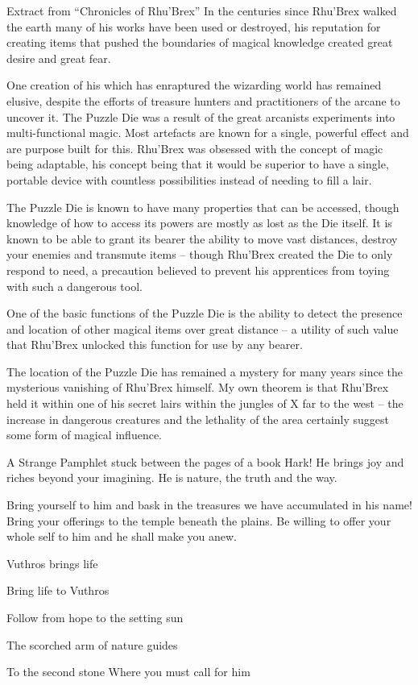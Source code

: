 \begin{DndComment}{Extract from ``Chronicles of Rhu'Brex''}
In the centuries since Rhu'Brex walked the earth many of his works have been used or destroyed, his reputation for creating items that pushed the boundaries of magical knowledge created great desire and great fear.

One creation of his which has enraptured the wizarding world has remained elusive, despite the efforts of treasure hunters and practitioners of the arcane to uncover it. The Puzzle Die was a result of the great arcanists experiments into multi-functional magic. Most artefacts are known for a single, powerful effect and are purpose built for this. Rhu'Brex was obsessed with the concept of magic being adaptable, his concept being that it would be superior to have a single, portable device with countless possibilities instead of needing to fill a lair.

The Puzzle Die is known to have many properties that can be accessed, though knowledge of how to access its powers are mostly as lost as the Die itself. It is known to be able to grant its bearer the ability to move vast distances, destroy your enemies and transmute items -- though Rhu'Brex created the Die to only respond to need, a precaution believed to prevent his apprentices from toying with such a dangerous tool.

One of the basic functions of the Puzzle Die is the ability to detect the presence and location of other magical items over great distance -- a utility of such value that Rhu'Brex unlocked this function for use by any bearer.

The location of the Puzzle Die has remained a mystery for many years since the mysterious vanishing of Rhu'Brex himself. My own theorem is that Rhu'Brex held it within one of his secret lairs within the jungles of X far to the west -- the increase in dangerous creatures and the lethality of the area certainly suggest some form of magical influence.
\end{DndComment}

\begin{DndComment}{A Strange Pamphlet stuck between the pages of a book}
Hark! He brings joy and riches beyond your imagining. He is nature, the truth and the way.

Bring yourself to him and bask in the treasures we have accumulated in his name! Bring your offerings to the temple beneath the plains. Be willing to offer your whole self to him and he shall make you anew.

Vuthros brings life

Bring life to Vuthros

Follow from hope to the setting sun

The scorched arm of nature guides

To the second stone Where you must call for him
\end{DndComment}

